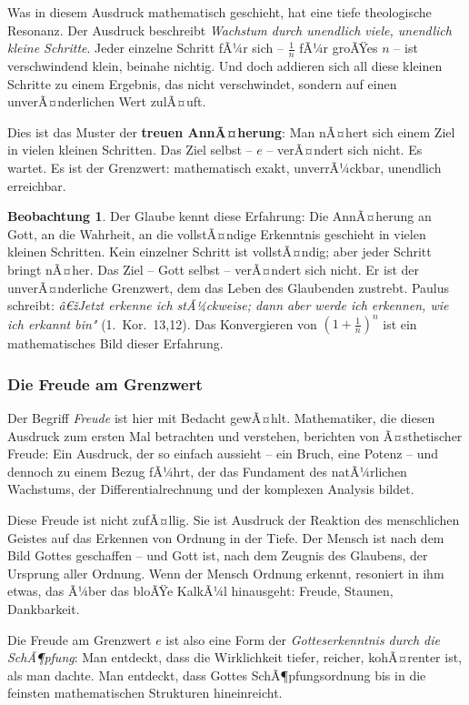 ﻿\documentclass[a4paper,12pt]{article}
\theoremstyle{definition}
\newtheorem{observation}{Beobachtung}[section]
\begin{document}
Was in diesem Ausdruck mathematisch geschieht, hat eine tiefe theologische Resonanz.
Der Ausdruck beschreibt \textit{Wachstum durch unendlich viele, unendlich kleine
	Schritte}. Jeder einzelne Schritt fÃ¼r sich -- $\frac{1}{n}$ fÃ¼r groÃŸes $n$ -- ist
verschwindend klein, beinahe nichtig. Und doch addieren sich all diese kleinen
Schritte zu einem Ergebnis, das nicht verschwindet, sondern auf einen unverÃ¤nderlichen
Wert zulÃ¤uft.

Dies ist das Muster der \textbf{treuen AnnÃ¤herung}: Man nÃ¤hert sich einem Ziel
in vielen kleinen Schritten. Das Ziel selbst -- $e$ -- verÃ¤ndert sich nicht.
Es wartet. Es ist der Grenzwert: mathematisch exakt, unverrÃ¼ckbar, unendlich
erreichbar.

\begin{observation}
	Der Glaube kennt diese Erfahrung: Die AnnÃ¤herung an Gott, an die Wahrheit,
	an die vollstÃ¤ndige Erkenntnis geschieht in vielen kleinen Schritten. Kein
	einzelner Schritt ist vollstÃ¤ndig; aber jeder Schritt bringt nÃ¤her. Das Ziel --
	Gott selbst -- verÃ¤ndert sich nicht. Er ist der unverÃ¤nderliche Grenzwert, dem
	das Leben des Glaubenden zustrebt. Paulus schreibt: \textit{â€žJetzt erkenne ich
		stÃ¼ckweise; dann aber werde ich erkennen, wie ich erkannt bin"} (1.~Kor.~13,12).
	Das Konvergieren von $\left(1+\frac{1}{n}\right)^n$ ist ein mathematisches Bild
	dieser Erfahrung.
\end{observation}

\subsubsection{Die Freude am Grenzwert}

Der Begriff \textit{Freude} ist hier mit Bedacht gewÃ¤hlt. Mathematiker, die diesen
Ausdruck zum ersten Mal betrachten und verstehen, berichten von Ã¤sthetischer Freude:
Ein Ausdruck, der so einfach aussieht -- ein Bruch, eine Potenz -- und dennoch
zu einem Bezug fÃ¼hrt, der das Fundament des natÃ¼rlichen
Wachstums, der Differentialrechnung und der komplexen Analysis bildet.

Diese Freude ist nicht zufÃ¤llig. Sie ist Ausdruck der Reaktion des menschlichen
Geistes auf das Erkennen von Ordnung in der Tiefe. Der Mensch ist nach dem Bild
Gottes geschaffen -- und Gott ist, nach dem Zeugnis des Glaubens, der Ursprung
aller Ordnung. Wenn der Mensch Ordnung erkennt, resoniert in ihm etwas, das Ã¼ber
das bloÃŸe KalkÃ¼l hinausgeht: Freude, Staunen, Dankbarkeit.

Die Freude am Grenzwert $e$ ist also eine Form der \textit{Gotteserkenntnis durch
	die SchÃ¶pfung}: Man entdeckt, dass die Wirklichkeit tiefer, reicher, kohÃ¤renter
ist, als man dachte. Man entdeckt, dass Gottes SchÃ¶pfungsordnung bis in die feinsten
mathematischen Strukturen hineinreicht.
\end{document}
